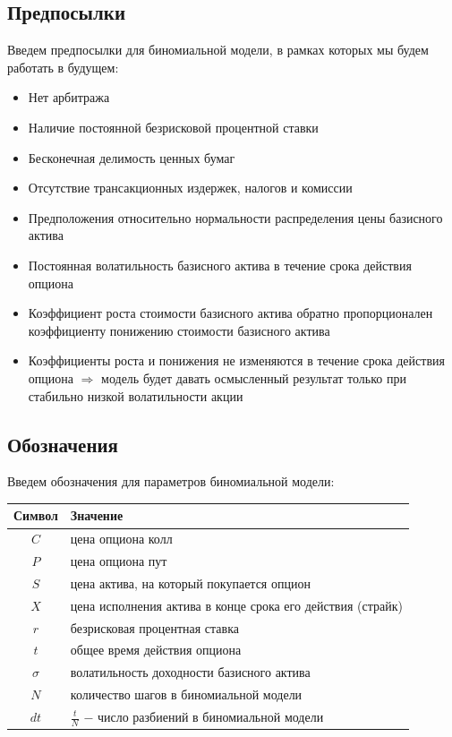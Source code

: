 \documentclass[a4paper,12pt]{extarticle} %
\begin{document}
	\subsection{Предпосылки}
	Введем предпосылки для биномиальной модели, в рамках которых мы будем работать в будущем:
	\begin{itemize}
		\item Нет арбитража
		\item Наличие постоянной безрисковой процентной ставки
		\item Бесконечная делимость ценных бумаг
		\item Отсутствие трансакционных издержек, налогов и комиссии
		\item Предположения относительно нормальности распределения цены базисного актива
		\item Постоянная волатильность базисного актива в течение срока действия опциона
		\item Коэффициент роста стоимости базисного актива обратно пропорционален коэффициенту понижению стоимости базисного актива
		\item Коэффициенты роста и понижения не изменяются в течение срока действия опциона $\Rightarrow$ модель будет давать осмысленный результат только при стабильно низкой волатильности акции
	\end{itemize}
	\subsection{Обозначения}
	Введем обозначения для параметров биномиальной модели:
	\begin{center}
		\begin{tabular}{|c|l|}
			\hline
			\textbf{Символ} & \textbf{Значение} \\
			\hline
			$C$ & цена опциона колл \\
			$P$ & цена опциона пут \\	
			$S$ & цена актива, на который покупается опцион \\
			$X$ & цена исполнения актива в конце срока его действия (страйк) \\
			$r$ & безрисковая процентная ставка \\
			$t$ & общее время действия опциона \\
			$\sigma$ & волатильность доходности базисного актива \\
			$N$ & количество шагов в биномиальной модели \\
			$dt$ & $\frac{t}{N}$ $-$ число разбиений в биномиальной модели \\
			\hline
		\end{tabular}
	\end{center}
	
\end{document}

